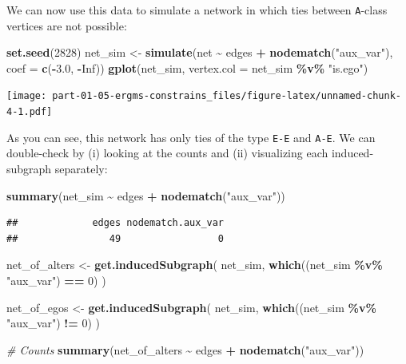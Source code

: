 \documentclass[
]{book}
\newenvironment{Shaded}{\begin{snugshade}}{\end{snugshade}}
\newcommand{\AttributeTok}[1]{\textcolor[rgb]{0.13,0.29,0.53}{#1}}
\newcommand{\CommentTok}[1]{\textcolor[rgb]{0.56,0.35,0.01}{\textit{#1}}}
\newcommand{\ConstantTok}[1]{\textcolor[rgb]{0.56,0.35,0.01}{#1}}
\newcommand{\DecValTok}[1]{\textcolor[rgb]{0.00,0.00,0.81}{#1}}
\newcommand{\FloatTok}[1]{\textcolor[rgb]{0.00,0.00,0.81}{#1}}
\newcommand{\FunctionTok}[1]{\textcolor[rgb]{0.13,0.29,0.53}{\textbf{#1}}}
\newcommand{\NormalTok}[1]{#1}
\newcommand{\OtherTok}[1]{\textcolor[rgb]{0.56,0.35,0.01}{#1}}
\newcommand{\SpecialCharTok}[1]{\textcolor[rgb]{0.81,0.36,0.00}{\textbf{#1}}}
\newcommand{\StringTok}[1]{\textcolor[rgb]{0.31,0.60,0.02}{#1}}
\begin{document}
We can now use this data to simulate a network in which ties between
\texttt{A}-class vertices are not possible:

\begin{Shaded}
\begin{Highlighting}[]
\FunctionTok{set.seed}\NormalTok{(}\DecValTok{2828}\NormalTok{)}
\NormalTok{net\_sim }\OtherTok{\textless{}{-}} \FunctionTok{simulate}\NormalTok{(net }\SpecialCharTok{\textasciitilde{}}\NormalTok{ edges }\SpecialCharTok{+} \FunctionTok{nodematch}\NormalTok{(}\StringTok{"aux\_var"}\NormalTok{), }\AttributeTok{coef =} \FunctionTok{c}\NormalTok{(}\SpecialCharTok{{-}}\FloatTok{3.0}\NormalTok{, }\SpecialCharTok{{-}}\ConstantTok{Inf}\NormalTok{))}
\FunctionTok{gplot}\NormalTok{(net\_sim, }\AttributeTok{vertex.col =}\NormalTok{ net\_sim }\SpecialCharTok{\%v\%} \StringTok{"is.ego"}\NormalTok{)}
\end{Highlighting}
\end{Shaded}

\texttt{[image: part-01-05-ergms-constrains\_files/figure-latex/unnamed-chunk-4-1.pdf]}

As you can see, this network has only ties of the type \texttt{E-E} and \texttt{A-E}. We can double-check by (i) looking at the counts and (ii) visualizing each induced-subgraph separately:

\begin{Shaded}
\begin{Highlighting}[]
\FunctionTok{summary}\NormalTok{(net\_sim }\SpecialCharTok{\textasciitilde{}}\NormalTok{ edges }\SpecialCharTok{+} \FunctionTok{nodematch}\NormalTok{(}\StringTok{"aux\_var"}\NormalTok{))}
\end{Highlighting}
\end{Shaded}

\begin{verbatim}
##             edges nodematch.aux_var 
##                49                 0
\end{verbatim}

\begin{Shaded}
\begin{Highlighting}[]
\NormalTok{net\_of\_alters }\OtherTok{\textless{}{-}} \FunctionTok{get.inducedSubgraph}\NormalTok{(}
\NormalTok{  net\_sim, }\FunctionTok{which}\NormalTok{((net\_sim }\SpecialCharTok{\%v\%} \StringTok{"aux\_var"}\NormalTok{) }\SpecialCharTok{==} \DecValTok{0}\NormalTok{)}
\NormalTok{  )}

\NormalTok{net\_of\_egos }\OtherTok{\textless{}{-}} \FunctionTok{get.inducedSubgraph}\NormalTok{(}
\NormalTok{  net\_sim, }\FunctionTok{which}\NormalTok{((net\_sim }\SpecialCharTok{\%v\%} \StringTok{"aux\_var"}\NormalTok{) }\SpecialCharTok{!=} \DecValTok{0}\NormalTok{)}
\NormalTok{  )}

\CommentTok{\# Counts}
\FunctionTok{summary}\NormalTok{(net\_of\_alters }\SpecialCharTok{\textasciitilde{}}\NormalTok{ edges }\SpecialCharTok{+} \FunctionTok{nodematch}\NormalTok{(}\StringTok{"aux\_var"}\NormalTok{))}
\end{Highlighting}
\end{Shaded}
\end{document}
